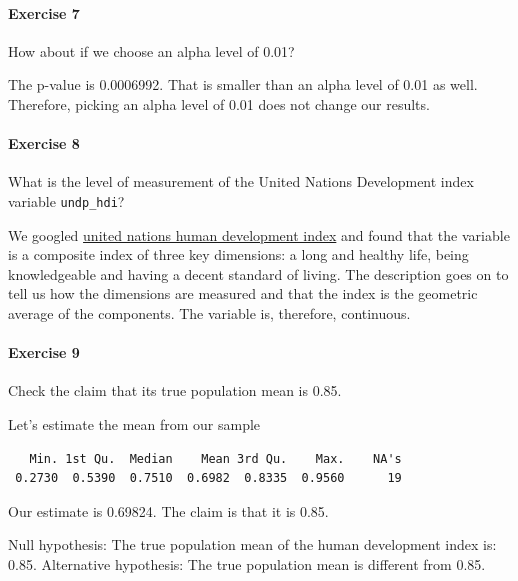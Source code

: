 \documentclass[]{article}
\newenvironment{Shaded}{\begin{snugshade}}{\end{snugshade}}
\newcommand{\KeywordTok}[1]{\textcolor[rgb]{0.13,0.29,0.53}{\textbf{#1}}}
\newcommand{\OperatorTok}[1]{\textcolor[rgb]{0.81,0.36,0.00}{\textbf{#1}}}
\newcommand{\NormalTok}[1]{#1}
\let\oldparagraph\paragraph
\renewcommand{\paragraph}[1]{\oldparagraph{#1}\mbox{}}
\theoremstyle{definition}
\theoremstyle{definition}
\theoremstyle{definition}
\theoremstyle{remark}
\begin{document}
\paragraph{Exercise 7}\label{exercise-7-2}

How about if we choose an alpha level of 0.01?

The p-value is 0.0006992. That is smaller than an alpha level of 0.01 as
well. Therefore, picking an alpha level of 0.01 does not change our
results.

\paragraph{Exercise 8}\label{exercise-8-3}

What is the level of measurement of the United Nations Development index
variable \texttt{undp\_hdi}?

We googled
\href{http://hdr.undp.org/en/content/human-development-index-hdi}{united
nations human development index} and found that the variable is a
composite index of three key dimensions: a long and healthy life, being
knowledgeable and having a decent standard of living. The description
goes on to tell us how the dimensions are measured and that the index is
the geometric average of the components. The variable is, therefore,
continuous.

\paragraph{Exercise 9}\label{exercise-9-2}

Check the claim that its true population mean is 0.85.

Let's estimate the mean from our sample

\begin{Shaded}
\end{Shaded}

\begin{verbatim}
   Min. 1st Qu.  Median    Mean 3rd Qu.    Max.    NA's 
 0.2730  0.5390  0.7510  0.6982  0.8335  0.9560      19 
\end{verbatim}

Our estimate is 0.69824. The claim is that it is 0.85.

Null hypothesis: The true population mean of the human development index
is: 0.85. Alternative hypothesis: The true population mean is different
from 0.85.
\end{document}
